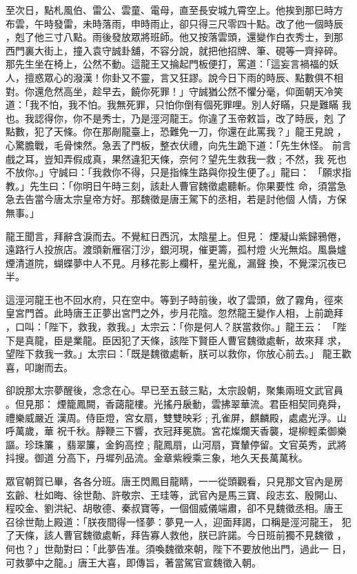 \begin{pinyinscope}
{至次日，點札風伯、雷公、雲童、電母，直至長安城九霄空上。他挨到那巳時方
布雲，午時發雷，未時落雨，申時雨止，卻只得三尺零四十點。改了他一個時辰
，剋了他三寸八點。雨後發放眾將班師。他又按落雲頭，還變作白衣秀士，到那
西門裏大街上，撞入袁守誠卦舖，不容分說，就把他招牌、筆、硯等一齊捽碎。
那先生坐在椅上，公然不動。這龍王又掄起門板便打，罵道：「這妄言禍福的妖
人，擅惑眾心的潑漢！你卦又不靈，言又狂謬。說今日下雨的時辰、點數俱不相
對。你還危然高坐，趁早去，饒你死罪！」守誠猶公然不懼分毫，仰面朝天冷笑
道：「我不怕，我不怕。我無死罪，只怕你倒有個死罪哩。別人好瞞，只是難瞞
我也。我認得你，你不是秀士，乃是涇河龍王。你違了玉帝敕旨，改了時辰，剋
了點數，犯了天條。你在那剮龍臺上，恐難免一刀，你還在此罵我？」龍王見說
，心驚膽戰，毛骨悚然。急丟了門板，整衣伏禮，向先生跪下道：「先生休怪。
前言戲之耳，豈知弄假成真，果然違犯天條，奈何？望先生救我一救﹔不然，我
死也不放你。」守誠曰：「我救你不得，只是指條生路與你投生便了。」龍曰：
「願求指教。」先生曰：「你明日午時三刻，該赴人曹官魏徵處聽斬。你果要性
命，須當急急去告當今唐太宗皇帝方好。那魏徵是唐王駕下的丞相，若是討他個
人情，方保無事。」

龍王聞言，拜辭含淚而去。不覺紅日西沉，太陰星上。但見：
煙凝山紫歸鴉倦，遠路行人投旅店。渡頭新雁宿汀沙，銀河現，催更籌，孤村燈
火光無焰。風裊爐煙清道院，蝴蝶夢中人不見。月移花影上欄杆，星光亂，漏聲
換，不覺深沉夜已半。

這涇河龍王也不回水府，只在空中。等到子時前後，收了雲頭，斂了霧角，徑來
皇宮門首。此時唐王正夢出宮門之外，步月花陰。忽然龍王變作人相，上前跪拜
，口叫：「陛下，救我，救我。」太宗云：「你是何人？朕當救你。」龍王云：
「陛下是真龍，臣是業龍。臣因犯了天條，該陛下賢臣人曹官魏徵處斬，故來拜
求，望陛下救我一救。」太宗曰：「既是魏徵處斬，朕可以救你，你放心前去。」
龍王歡喜，叩謝而去。

卻說那太宗夢醒後，念念在心。早已至五鼓三點，太宗設朝，聚集兩班文武官員
。但見那：
煙籠鳳闕，香藹龍樓。光搖丹扆動，雲拂翠華流。君臣相契同堯舜，禮樂威嚴近
漢周。侍臣燈，宮女扇，雙雙映彩﹔孔雀屏，麒麟殿，處處光浮。山呼萬歲，華
祝千秋。靜鞭三下響，衣冠拜冕旒。宮花燦爛天香襲，堤柳輕柔御樂謳。珍珠簾
，翡翠簾，金鉤高控﹔龍鳳扇，山河扇，寶輦停留。文官英秀，武將抖搜。御道
分高下，丹墀列品流。金章紫綬乘三象，地久天長萬萬秋。

眾官朝賀已畢，各各分班。唐王閃鳳目龍睛，一一從頭觀看，只見那文官內是房
玄齡、杜如晦、徐世勣、許敬宗、王珪等，武官內是馬三寶、段志玄、殷開山、
程咬金、劉洪紀、胡敬德、秦叔寶等，一個個威儀端肅，卻不見魏徵丞相。唐王
召徐世勣上殿道：「朕夜間得一怪夢：夢見一人，迎面拜謁，口稱是涇河龍王，
犯了天條，該人曹官魏徵處斬，拜告寡人救他，朕已許諾。今日班前獨不見魏徵
，何也？」世勣對曰：「此夢告准。須喚魏徵來朝，陛下不要放他出門，過此一
日，可救夢中之龍。」唐王大喜，即傳旨，著當駕官宣魏徵入朝。

}
\end{pinyinscope}
